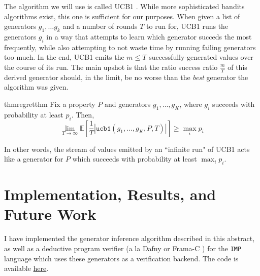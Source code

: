 \documentclass[sigconf,nonacm,review,anonymous]{acmart}
\begin{document}
The algorithm we will use is called UCB1 \cite{auer2002finite}. While more sophisticated
bandits algorithms exist, this one is sufficient for our purposes. When given a list of generators
$g_1,\dots g_k$ and a number of rounds $T$ to run for, UCB1 runs the generators $g_i$ in a way that attempts
to learn which generator succeds the most frequently, while also attempting to not waste time by running
failing generators too much. In the end, UCB1 emits the $m \leq T$ successfully-generated values over the course of its run.
The main upshot is that the ratio success ratio $\frac{m}{T}$ of this derived generator should, in the limit,
be no worse than the \emph{best} generator the algorithm was given. 
\begin{restatable}{thm}{regretthm}
Fix a property $P$ and generators $g_1,\dots,g_K$, where $g_i$ succeeds with probability at least $p_i$. Then,
\vspace{-2px}
\[
\lim_{T \to \infty} \mathbb{E}\left[\frac{1}{T}\left|\texttt{ucb1}(g_1,\dots,g_K,P,T)\right|\right] \geq \max_i p_i
\]
\end{restatable}
In other words, the stream of values
emitted by an ``infinite run" of UCB1 acts like a
generator for $P$ which succeeds with probability at least $\max_i p_i$.


\section{Implementation, Results, and Future Work}
\label{sec:impl}

I have implemented the generator inference algorithm described in this abstract,
as well as a deductive program verifier (a la Dafny or Frama-C \cite{dafny,framac}) for the
\texttt{IMP} language which uses these generators as a verification backend.
The code is available \href{https://github.com/jdublu10/triple-testing}{here}.
\end{document}
